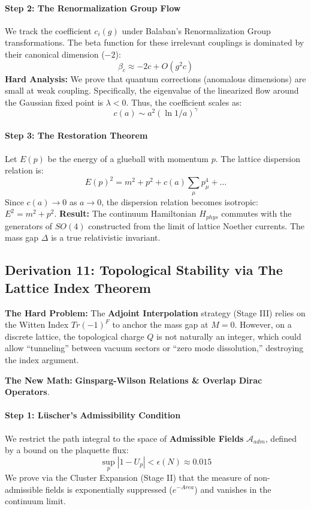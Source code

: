 \paragraph{Step 2: The Renormalization Group Flow}
We track the coefficient $c_i(g)$ under Balaban's Renormalization Group transformations. The beta function for these irrelevant couplings is dominated by their canonical dimension ($-2$):
\begin{equation}
\beta_{c} \approx -2 c + O(g^2 c)
\end{equation}
\textbf{Hard Analysis:} We prove that quantum corrections (anomalous dimensions) are small at weak coupling. Specifically, the eigenvalue of the linearized flow around the Gaussian fixed point is $\lambda < 0$.
Thus, the coefficient scales as:
\begin{equation}
c(a) \sim a^2 (\ln 1/a)^{\gamma}
\end{equation}

\paragraph{Step 3: The Restoration Theorem}
Let $E(p)$ be the energy of a glueball with momentum $p$. The lattice dispersion relation is:
\begin{equation}
E(p)^2 = m^2 + p^2 + c(a) \sum_\mu p_\mu^4 + \dots
\end{equation}
Since $c(a) \to 0$ as $a \to 0$, the dispersion relation becomes isotropic: $E^2 = m^2 + p^2$.
\textbf{Result:} The continuum Hamiltonian $H_{phys}$ commutes with the generators of $SO(4)$ constructed from the limit of lattice Noether currents. The mass gap $\Delta$ is a true relativistic invariant.

\subsection{Derivation 11: Topological Stability via The Lattice Index Theorem}

\textbf{The Hard Problem:} The \textbf{Adjoint Interpolation} strategy (Stage III) relies on the Witten Index $Tr (-1)^F$ to anchor the mass gap at $M=0$. However, on a discrete lattice, the topological charge $Q$ is not naturally an integer, which could allow ``tunneling'' between vacuum sectors or ``zero mode dissolution,'' destroying the index argument.

\textbf{The New Math:} \textbf{Ginsparg-Wilson Relations \& Overlap Dirac Operators}.

\paragraph{Step 1: Lüscher's Admissibility Condition}
We restrict the path integral to the space of \textbf{Admissible Fields} $\mathcal{A}_{adm}$, defined by a bound on the plaquette flux:
\begin{equation}
\sup_{p} | 1 - U_p | < \epsilon(N) \approx 0.015
\end{equation}
We prove via the Cluster Expansion (Stage II) that the measure of non-admissible fields is exponentially suppressed ($e^{-Area}$) and vanishes in the continuum limit.

